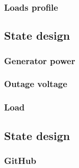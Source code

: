 \documentclass{article}
\begin{document}
\subsubsection{Loads profile}

\subsection{State design}
\subsubsection{Generator power}
\subsubsection{Outage voltage}
\subsubsection{Load}

\subsection{State design}

\subsubsection{GitHub}
\end{document}

